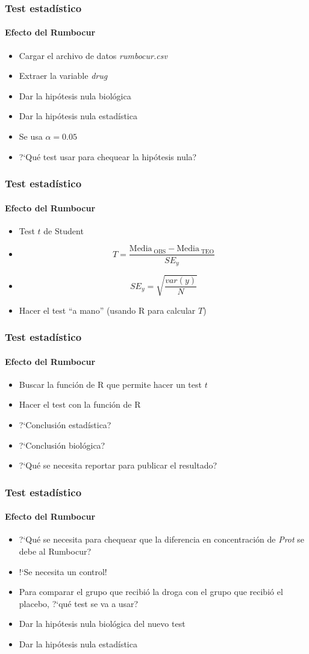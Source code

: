 \documentclass[mathserif]{beamer}
\begin{document}
\begin{frame}[plain,label=d38]%
\frametitle{Test estad\'istico}
\framesubtitle{Efecto del Rumbocur}
\begin{itemize}
   \item Cargar el archivo de datos \emph{rumbocur.csv}
   \item Extraer la variable \emph{drug} 
   \item Dar la hip\'otesis nula biol\'ogica
   \item Dar la hip\'otesis nula estad\'istica
   \item Se usa $\alpha=0.05$
   \item ?`Qu\'e test usar para chequear la hip\'otesis nula?
\end{itemize}
\end{frame}%

\begin{frame}[plain,label=d39]%
\frametitle{Test estad\'istico}
\framesubtitle{Efecto del Rumbocur}
\begin{itemize}
   \item Test $t$ de Student
   \medskip
   \item $$T=\frac{\mathrm{Media_{\;OBS}} -  \mathrm{Media_{\;TEO}} }{SE_{y}}$$
   \medskip
   \item $$SE_{y}=\sqrt{\frac{var(y)}{N}}$$
   \item Hacer el test ``a mano'' (usando R para calcular $T$)
\end{itemize}
\end{frame}%

\begin{frame}[plain,label=d40]%
\frametitle{Test estad\'istico}
\framesubtitle{Efecto del Rumbocur}
\begin{itemize}
   \item Buscar la funci\'on de R que permite hacer un test $t$
   \item Hacer el test con la funci\'on de R
   \item ?`Conclusi\'on estad\'istica?
   \item ?`Conclusi\'on biol\'ogica?
   \item ?`Qu\'e se necesita reportar para publicar el resultado?
\end{itemize}
\end{frame}%

\begin{frame}[plain,label=d41]%
\frametitle{Test estad\'istico}
\framesubtitle{Efecto del Rumbocur}
\begin{itemize}[<+-| visible@+->]
   \item ?`Qu\'e se necesita para chequear que la diferencia en concentraci\'on de \emph{Prot} se debe al Rumbocur?
   \item !`Se necesita un control!
   \item Para comparar el grupo que recibi\'o la droga con el grupo que recibi\'o el placebo, ?`qu\'e test se va a usar?
   \item Dar la hip\'otesis nula biol\'ogica del nuevo test
   \item Dar la hip\'otesis nula estad\'istica
\end{itemize}
\end{frame}%
\end{document}
